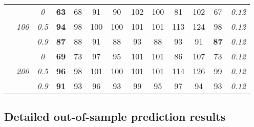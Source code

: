 \begin{table}
\begin{center}
\begin{tabular}{ccc|cc|cc|cc|cc|c|c}
\cline{2-3}\rule{0pt}{3ex}
& & \it  0  & {\bf 63} & 68 & 91 & 90 & 102 & 100 & 81 & 102 & 67 & \it  0.12 \\
 & \it  100  & \it  0.5  & {\bf 94} & 98 & 100 & 100 & 101 & 101 & 113 & 124 & 98 & \it  0.12 \\
& & \it  0.9  & {\bf 87} & 88 & 91 & 88 & 93 & 88 & 93 & 91 & {\bf 87} & \it  0.12 \\[1ex]
\cline{2-3}\rule{0pt}{3ex}
& & \it  0  & {\bf 69} & 73 & 97 & 95 & 101 & 101 & 86 & 107 & 73 & \it  0.12 \\
 & \it  200  & \it  0.5  & {\bf 96} & 98 & 101 & 100 & 101 & 101 & 114 & 126 & 99 & \it  0.12 \\
& & \it  0.9  & {\bf 91} & 93 & 96 & 93 & 99 & 95 & 97 & 94 & 93 & \it  0.12 \\
\hline\end{tabular}
\end{center}
\end{table}



\clearpage

\subsection{Detailed out-of-sample prediction results}



